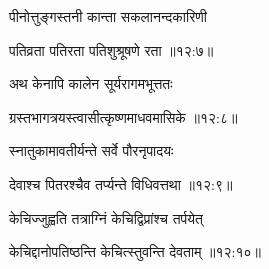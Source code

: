 {\devanagarifont पीनोत्तुङ्गस्तनी कान्ता सकलानन्दकारिणी  \danda\dontdisplaylinenum }%


{\devanagarifont पतिव्रता पतिरता पतिशुश्रूषणे रता {॥१२:७॥} \veg\dontdisplaylinenum }%

{\devanagarifont अथ केनापि कालेन सूर्यरागमभूत्ततः \thinspace{\dandab} \dontdisplaylinenum }%


{\devanagarifont ग्रस्तभागत्रयस्त्वासीत्कृष्णमाधवमासिके {॥१२:८॥} \veg\dontdisplaylinenum }%
 
{\devanagarifont स्नातुकामावतीर्यन्ते सर्वे पौरनृपादयः \thinspace{\dandab} \dontdisplaylinenum }%


{\devanagarifont देवाश्च पितरश्चैव तर्प्यन्ते विधिवत्तथा {॥१२:९॥} \veg\dontdisplaylinenum }%

{\devanagarifont केचिज्जुह्वति तत्राग्निं केचिद्विप्रांश्च तर्पयेत् \thinspace{\dandab} \dontdisplaylinenum }%


{\devanagarifont केचिद्दानोपतिष्ठन्ति केचित्स्तुवन्ति देवताम् {॥१२:१०॥} \veg\dontdisplaylinenum }%

